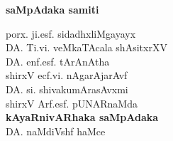 \phantom{a}

\vfill

\begin{center}
{\Large\bf saMpAdaka samiti}

\bigskip
\medskip

{\fontsize{14pt}{16pt}\selectfont
porx. ji.esf. sidadhxliMgayayx\\[8pt]
DA. Ti.vi. veMkaTAcala shAsitxrXV\\[8pt]
DA. enf.esf. tArAnAtha\\[8pt]
shirxV ecf.vi. nAgarAjarAvf\\[8pt]
DA. si. shivakumArasAvxmi\\[8pt]
shirxV Arf.esf. pUNARnaMda\\[15pt]
{\bf kAyaRnivARhaka saMpAdaka}\\[8pt]
DA. naMdiVshf haMce }\relax
\end{center}

\vfill

\phantom{a}







